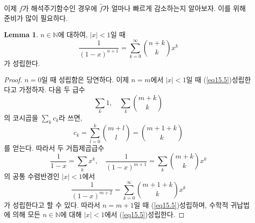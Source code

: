 \documentclass[11pt]{book}
\numberwithin{equation}{chapter}
\def\NN{\mathbb{N}}
\newcommand{\abs}[1]{\left\vert#1\right\vert}
\theoremstyle{definition}
\newtheorem{lem}[thm]{Lemma}
\begin{document}
이제 \(f\)가 해석주기함수인 경우에 \(\hat{f}\)가 얼마나 빠르게 감소하는지 알아보자. 이를 위해 준비가 많이 필요하다.

\begin{lem} \label{15.3.8}
    \(n \in \NN\)에 대하여, \(\abs{x} < 1\)일 때
    \begin{equation} \label{eq15.5}
        \frac{1}{(1-x)^{n+1}} = \sum_{k=0}^\infty \binom{n+k}{k} x^k
    \end{equation}
    가 성립한다.
\end{lem}
\begin{proof}
    \(n = 0\)일 때 성립함은 당연하다. 이제 \(n = m\)에서 \(\abs{x} < 1\)일 때 (\ref{eq15.5})\가 성립한다고 가정하자. 다음 두 급수
    \[
        \sum_k 1, \quad \sum_k \binom{m+k}{k}
    \]
    의 코시곱을 \(\sum_k c_k\)라 쓰면,
    \[
        c_k = \sum_{l=0}^k \binom{m+l}{l} = \binom{m+1+k}{k}
    \]
    를 얻는다. 따라서 두 거듭제곱급수
    \[
        \frac{1}{1-x} = \sum_k x^k, \quad \frac{1}{(1-x)^{m+1}} = \sum_k \binom{m+k}{k} x^k
    \]
    의 공통 수렴반경인 \(\abs{x} < 1\)에서
    \[
        \frac{1}{(1-x)^{m+2}} = \sum_{k=0}^\infty \binom{m+1+k}{k} x^k
    \]
    가 성립한다고 할 수 있다. 따라서 \(n = m+1\)일 때 (\ref{eq15.5})\가 성립하며, 수학적 귀납법에 의해 모든 \(n \in \NN\)에 대해 \(\abs{x} < 1\)에서 (\ref{eq15.5})\가 성립한다.
\end{proof}
\end{document}
